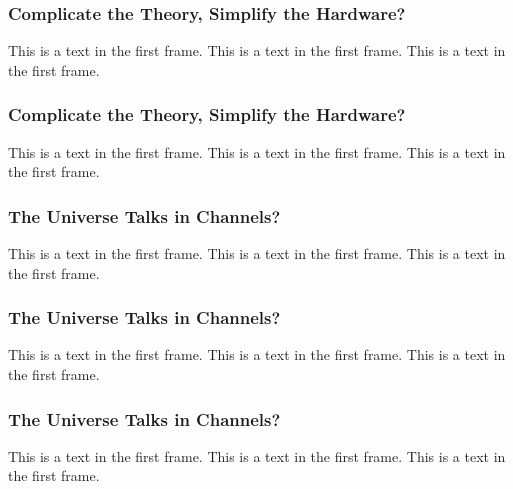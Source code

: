 \documentclass{beamer}
\begin{document}
\begin{frame}
\frametitle{Complicate the Theory, Simplify the Hardware?}
This is a text in the first frame. This is a text in the first frame. This is a text in the first frame.
\end{frame}

\begin{frame}
\frametitle{Complicate the Theory, Simplify the Hardware?}
This is a text in the first frame. This is a text in the first frame. This is a text in the first frame.
\end{frame}

\begin{frame}
\frametitle{The Universe Talks in Channels?}
This is a text in the first frame. This is a text in the first frame. This is a text in the first frame.
\end{frame}

\begin{frame}
\frametitle{The Universe Talks in Channels?}
This is a text in the first frame. This is a text in the first frame. This is a text in the first frame.
\end{frame}

\begin{frame}
\frametitle{The Universe Talks in Channels?}
This is a text in the first frame. This is a text in the first frame. This is a text in the first frame.
\end{frame}
\end{document}
